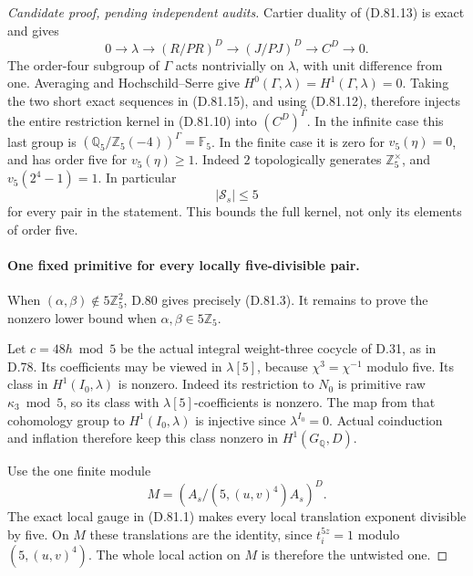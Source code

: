 \begin{proof}[Candidate proof, pending independent audits]
Cartier duality of (D.81.13) is exact and gives
\[
 0\longrightarrow\lambda\longrightarrow (R/PR)^D
       \longrightarrow (J/PJ)^D\longrightarrow C^D
       \longrightarrow0.                                \tag{D.81.15}
\]
The order-four subgroup of \(\Gamma\) acts nontrivially
on \(\lambda\), with unit difference from one. Averaging
and Hochschild--Serre give
\(H^0(\Gamma,\lambda)=H^1(\Gamma,\lambda)=0\).
Taking the two short exact sequences in (D.81.15), and
using (D.81.12), therefore injects the entire restriction
kernel in (D.81.10) into \((C^D)^\Gamma\).
In the infinite case this last group is
\((\mathbb Q_5/\mathbb Z_5(-4))^\Gamma=\mathbb F_5\).
In the finite case it is zero for \(v_5(\eta)=0\), and
has order five for \(v_5(\eta)\ge1\).
Indeed \(2\) topologically generates \(\mathbb Z_5^\times\),
and \(v_5(2^4-1)=1\). In particular
\[
                         |\mathcal S_s|\le5            \tag{D.81.16}
\]
for every pair in the statement. This bounds the full kernel,
not only its elements of order five.

\paragraph{One fixed primitive for every locally five-divisible pair.}
When \((\alpha,\beta)\notin5\mathbb Z_5^2\), D.80 gives
precisely (D.81.3). It remains to prove the nonzero lower bound
when \(\alpha,\beta\in5\mathbb Z_5\).

Let \(c=48h\bmod5\) be the actual integral weight-three cocycle
of D.31, as in D.78. Its coefficients may be viewed in
\(\lambda[5]\), because \(\chi^3=\chi^{-1}\) modulo five.
Its class in \(H^1(I_0,\lambda)\) is nonzero.
Indeed its restriction to \(N_0\) is primitive raw
\(\kappa_3\bmod5\), so its class with \(\lambda[5]\)-coefficients
is nonzero. The map from that cohomology group to
\(H^1(I_0,\lambda)\) is injective since \(\lambda^{I_0}=0\).
Actual coinduction and inflation therefore keep this class
nonzero in \(H^1(G_{\mathbb Q},D)\).

Use the one finite module
\[
 M=(A_s/(5,(u,v)^4)A_s)^D.
                                                               \tag{D.81.17}
\]
The exact local gauge in (D.81.1) makes every local translation
exponent divisible by five. On \(M\) these translations are
the identity, since \(t_i^{5z}=1\) modulo \((5,(u,v)^4)\).
The whole local action on \(M\) is therefore the untwisted one.


\end{proof}
